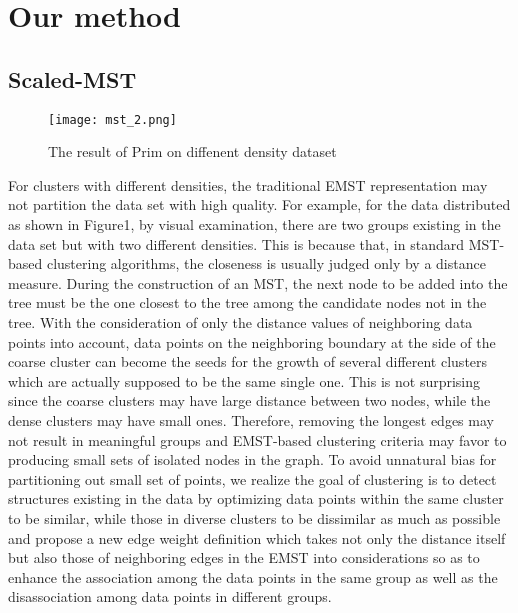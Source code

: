 
\section{Our method} 
	\subsection{Scaled-MST}
	  \begin{figure}[htb]
	        \centering
	        \texttt{[image: mst\_2.png]}
	        \caption{The result of Prim on diffenent density dataset}
	  \end{figure}
	  For clusters with different densities, the traditional EMST representation may not partition the data set with high quality. For example, for the data distributed as shown in Figure1, by visual examination, there are two groups existing in the data set but with two different densities. This is because that, in standard MST-based clustering algorithms, the closeness is usually judged only by a distance measure. During the construction of an MST, the next node to be added into the tree must be the one closest to the tree among the candidate nodes not in the tree. With the consideration of only the distance values of neighboring data points into account, data points on the neighboring boundary at the side of the coarse cluster can become the seeds for the growth of several different clusters which are actually supposed to be the same single one. This is not surprising since the coarse clusters may have large distance between two nodes, while the dense clusters may have small ones. Therefore, removing the longest edges may not result in meaningful groups and EMST-based clustering criteria may favor to producing small sets of isolated nodes in the graph. To avoid unnatural bias for partitioning out small set of points, we realize the goal of clustering is to detect structures existing in the data by optimizing data points within the same cluster to be similar, while those in diverse clusters to be dissimilar as much as possible and propose a new edge weight definition which takes not only the distance itself but also those of neighboring edges in the EMST into considerations so as to enhance the association among the data points in the same group as well as the disassociation among data points in different groups.
